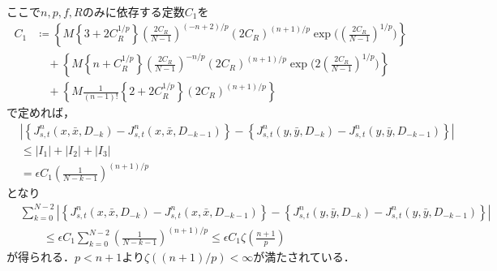 \begin{prf}
\begin{description}
\begin{align}
				\end{align}
				ここで$n,p,f,R$のみに依存する定数$C_1$を
				\begin{align}
					C_1 &\coloneqq \left\{ M \left\{ 3 + 2 C_R^{1/p} \right\} \left( \frac{2C_R}{N-1} \right)^{(-n+2)/p}
						\left( 2C_R \right)^{(n+1)/p} \operatorname{exp}\Biggl(\left( \frac{2C_R}{N-1} \right)^{1/p}\Biggr)\right\} \\
						&\quad + \left\{ M \left\{ n + C_R^{1/p} \right\} \left( \frac{2C_R}{N-1} \right)^{-n/p}(2C_R)^{(n+1)/p}
						\operatorname{exp}\Biggl( 2\left(\frac{2C_R}{N-1}\right)^{1/p} \Biggr) \right\} \\
						&\quad + \left\{ M \frac{1}{(n-1)!} \left\{ 2 + 2 C_R^{1/p} \right\} (2C_R)^{(n+1)/p} \right\}
				\end{align}
				で定めれば，
				\begin{align}
					&\left| \left\{J^n_{s,t}(x,\bar{x},D_{-k}) - J^n_{s,t}(x,\bar{x},D_{-k-1})\right\} - \left\{J^n_{s,t}(y,\bar{y},D_{-k}) - J^n_{s,t}(y,\bar{y},D_{-k-1})\right\} \right| \\
					&\leq |I_1| + |I_2| + |I_3| \\
					&= \epsilon C_1 \left( \frac{1}{N-k-1} \right)^{(n+1)/p}
				\end{align}
				となり
				\begin{align}
					&\sum_{k=0}^{N-2} \left| \left\{J^n_{s,t}(x,\bar{x},D_{-k}) - J^n_{s,t}(x,\bar{x},D_{-k-1})\right\} - \left\{J^n_{s,t}(y,\bar{y},D_{-k}) - J^n_{s,t}(y,\bar{y},D_{-k-1})\right\} \right| \\
					&\qquad \leq \epsilon C_1 \sum_{k=0}^{N-2} \left( \frac{1}{N-k-1} \right)^{(n+1)/p}
					\leq \epsilon C_1 \zeta\left( \frac{n+1}{p} \right)
				\end{align}
				が得られる．$p < n+1$より$\zeta((n+1)/p) < \infty$が満たされている．
				

\end{description}
\end{prf}
